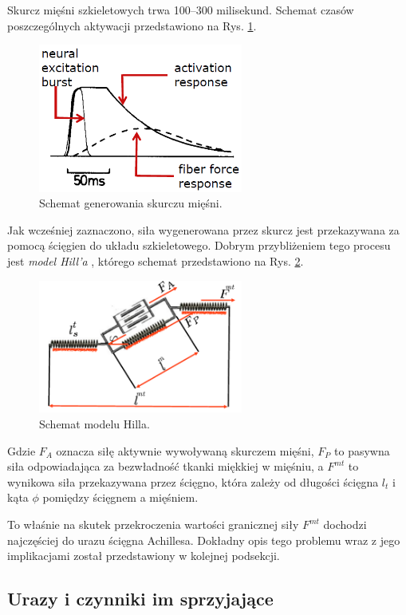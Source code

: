 Skurcz mięśni szkieletowych trwa 100--300 milisekund. Schemat czasów poszczególnych aktywacji przedstawiono na Rys. \ref{muscle-excitements}. 
\begin{figure}[h!]
	\centering
	\includegraphics[width=0.6\textwidth]{figures/skurcz_miesni.png}
	\caption{Schemat generowania skurczu mięśni.}
	\label{muscle-excitements}
\end{figure}
Jak wcześniej zaznaczono, siła wygenerowana przez skurcz jest przekazywana za pomocą ścięgien do układu szkieletowego. Dobrym przybliżeniem tego procesu jest \textit{model Hill'a} \cite{Hill1938}, którego schemat przedstawiono na Rys. \ref{hill-model}.
\begin{figure}[h!]
	\centering
	\includegraphics[width=0.6\textwidth]{figures/Hill.png}
	\caption{Schemat modelu Hilla.}
	\label{hill-model}
\end{figure}
Gdzie $F_A$ oznacza siłę aktywnie wywoływaną skurczem mięśni, $F_P$ to pasywna siła odpowiadająca za bezwładność tkanki miękkiej w mięśniu, a $F^{mt}$ to wynikowa siła przekazywana przez ścięgno, która zależy od długości ścięgna $l_t$ i kąta $\phi$ pomiędzy ścięgnem a mięśniem. 

To właśnie na skutek przekroczenia wartości granicznej siły $F^{mt}$ dochodzi najczęściej do urazu ścięgna Achillesa. Dokładny opis tego problemu wraz z jego implikacjami został przedstawiony w kolejnej podsekcji.

\subsection{Urazy i czynniki im sprzyjające}

